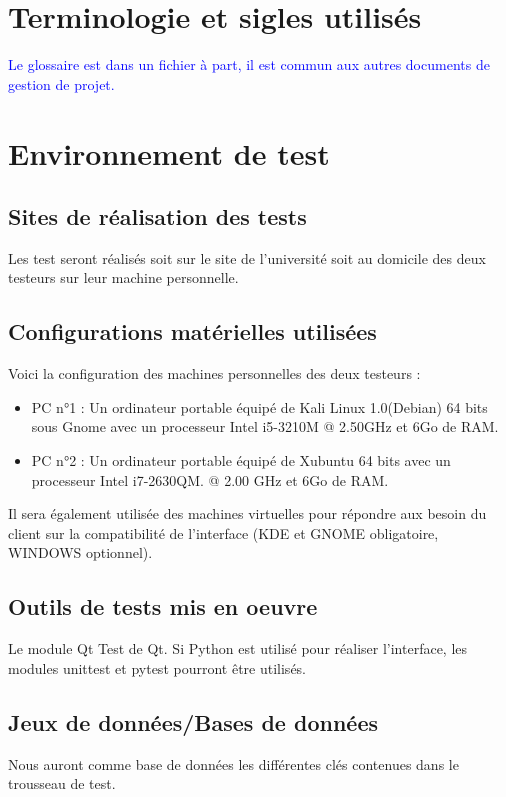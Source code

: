 \documentclass{../res/univ-projet}
\begin{document}
\section{Terminologie et sigles utilisés}
\textcolor{blue}{
  Le glossaire est dans un fichier à part, il est commun aux autres documents de gestion de projet.
}

\section{Environnement de test}
\subsection{Sites de réalisation des tests}
Les test seront réalisés soit sur le site de l'université soit au domicile des deux testeurs sur leur machine personnelle.



\subsection{Configurations matérielles utilisées}
Voici la configuration des machines personnelles des deux testeurs :
\begin{itemize}
 \item PC n°1 : Un ordinateur portable équipé de Kali Linux 1.0(Debian) 64 bits sous Gnome avec un processeur Intel i5-3210M @ 2.50GHz et 6Go de RAM.
 \item PC n°2 : Un ordinateur portable équipé de Xubuntu 64 bits avec un processeur Intel i7-2630QM.
 @ 2.00 GHz et 6Go de RAM.
\end{itemize}
Il sera également utilisée des machines virtuelles pour répondre aux besoin du client sur la compatibilité de l'interface (KDE et GNOME obligatoire,
WINDOWS optionnel).

\subsection{Outils de tests mis en oeuvre}
Le module Qt Test de Qt.
Si Python est utilisé pour réaliser l'interface, les modules unittest et pytest pourront être utilisés.

\subsection{Jeux de données/Bases de données}
Nous auront comme base de données les différentes clés contenues dans le trousseau de test.
\end{document}

